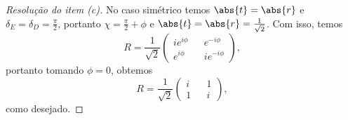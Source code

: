 \begin{proof}[Resolução do item (c)]
    No caso simétrico temos \(\abs{t} = \abs{r}\) e \(\delta_E = \delta_D = \frac{\pi}{2}\), portanto \(\chi = \frac{\pi}{2} + \phi\) e \(\abs{t} = \abs{r} = \frac1{\sqrt{2}}\). Com isso, temos
    \begin{equation*}
        R = \frac{1}{\sqrt{2}}\begin{pmatrix}
            ie^{i\phi} && e^{-i\phi}\\
            e^{i\phi} && ie^{-i\phi}
        \end{pmatrix},
    \end{equation*}
    portanto tomando \(\phi = 0\), obtemos
    \begin{equation*}
        R = \frac{1}{\sqrt{2}}\begin{pmatrix}
            i && 1\\
            1 && i
        \end{pmatrix},
    \end{equation*}
    como desejado.
\end{proof}

